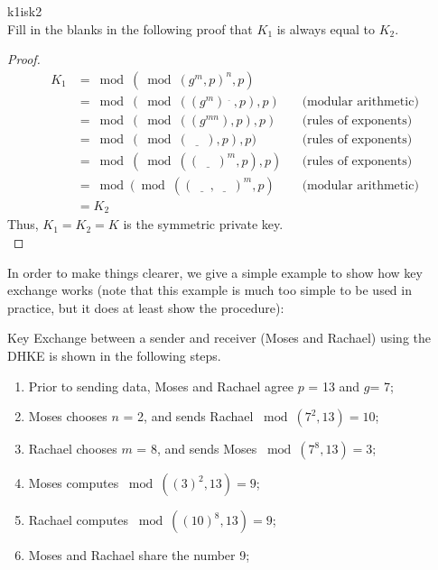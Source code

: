 \begin{exercise}{k1isk2}\\
Fill in the blanks in the following proof that  $K_1$ is always equal to  $K_2$.\\
  	\begin{proof} 
		\begin{align*} 
		K_1 &=   \bmod ( \bmod (g^m , p)^n , p ) 
           	\\&=  \bmod ( \bmod ((g^m)^{\underline{~~~~}} , p) , p )&& \text{(modular arithmetic)}	%
		\\&= \bmod ( \bmod ((g^{mn}) , p) , p )&&  \text{(rules of exponents)}	%
           	\\&= \bmod ( \bmod (\underline{~~~~~~}) , p) , p ) &&\text{(rules of exponents)}	%
           	\\&= \bmod ( \bmod ((\underline{~~~~~~})^m , p) , p )  &&\text{(rules of exponents)}	%
           	\\&= \bmod ( \bmod ((\underline{~~~~~~} , \underline{~~~~~~})^m , p )&&\text{(modular arithmetic)}   	%
		\\&= K_2
		\end{align*} 
   	Thus, $K_1 = K_2 = K$ is the symmetric private key.\\

  	\end{proof}
\end{exercise}

In order to make things clearer, we give a simple example to show how key exchange works (note that this example is much too simple to be used in practice, but it does at least show the procedure):

\begin{eg} Key Exchange between a sender and receiver (Moses and Rachael) using the DHKE is shown in the following steps.
\begin{enumerate}[Step 1.]
\item Prior to sending data, Moses and Rachael agree $p$ = 13 and $g$= 7; 
\item Moses chooses $n$ = 2, and sends Rachael $\bmod (7^2 , 13) = 10$;
\item Rachael chooses $m$ = 8, and sends Moses $\bmod (7^8  , 13) = 3 $;
\item Moses computes $\bmod ((3)^2 , 13 ) = 9$;
\item Rachael computes $\bmod ((10)^8 , 13 ) = 9$;
\item Moses and Rachael share the number 9;
\end{enumerate}
\end{eg}

